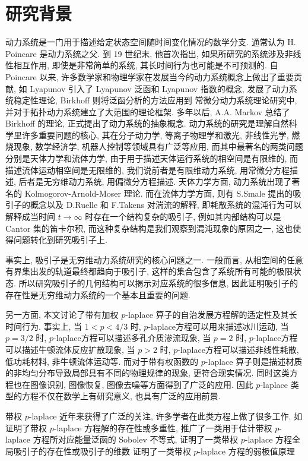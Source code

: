 \documentclass[oneside,longtitle]{LZUthesis}
\numberwithin{equation}{chapter}
\begin{document}
\section{研究背景}
动力系统是一门用于描述给定状态空间随时间变化情况的数学分支.
通常认为 H. Poincare 是动力系统之父.
到 19 世纪末, 他首次指出, 如果所研究的系统涉及非线性相互作用,
即使是非常简单的系统, 其长时间行为也可能是不可预测的.
自 Poincare 以来,
许多数学家和物理学家在发展当今的动力系统概念上做出了重要贡献,
如 Lyapunov 引入了 Lyapunov 泛函和 Lyapunov 指数的概念,
发展了动力系统稳定性理论, Birkhoff 则将泛函分析的方法应用到
常微分动力系统理论研究中, 并对于拓扑动力系统建立了大范围的理论框架.
多年以后, A.A. Markov 总结了 Birkhoff 的理论, 正式提出了动力系统的抽象概念.
动力系统的研究是理解自然科学里许多重要问题的核心,
其在分子动力学, 等离子物理学和激光, 非线性光学, 燃烧现象, 数学经济学, 机器人控制等领域具有广泛等应用,
而其中最著名的两类问题分别是天体力学和流体力学,
由于用于描述天体运行系统的相空间是有限维的, 而描述流体运动相空间是无限维的,
我们说前者是有限维动力系统, 用常微分方程描述, 后者是无穷维动力系统, 用偏微分方程描述.
天体力学方面, 动力系统出现了著名的 Kolmogorov-Arnold-Moser 理论.
而在流体力学方面, 则有 S.Smale 提出的吸引子的概念以及 D.Ruelle 和 F.Takens 对湍流的解释,
即耗散系统的混沌行为可以解释成当时间
$t \to \infty$ 时存在一个结构复杂的吸引子, 例如其内部结构可以是 Cantor 集的笛卡尔积,
而这种复杂结构是我们观察到混沌现象的原因之一, 这也使得问题转化到研究吸引子上.

事实上, 吸引子是无穷维动力系统研究的核心问题之一.
一般而言, 从相空间的任意有界集出发的轨道最终都趋向于吸引子,
这样的集合包含了系统所有可能的极限状态.
所以研究吸引子的几何结构可以揭示对应系统的很多信息,
因此证明吸引子的存在性是无穷维动力系统的一个基本且重要的问题.

另一方面, 本文讨论了带有加权 $p$-laplace 算子的自治发展方程解的适定性及其长时间行为.
事实上, 当 $1 < p < 4/3$ 时, $p$-laplace方程可以用来描述冰川运动,
当 $p = 3/2$ 时, $p$-laplace方程可以描述多孔介质渗流现象,
当 $p = 2$ 时, $p$-laplace方程可以描述牛顿流体反应扩散现象,
当 $p > 2$ 时, $p$-laplace方程可以描述非线性耗散, 低功耗材料, 非牛顿流体运动等.
而对于带有权函数的 $p$-laplace 算子则是描述材质的非均匀分布导致局部具有不同的物理规律的现象,
更符合现实情况. 同时这类方程也在图像识别, 图像恢复, 图像去噪等方面得到了广泛的应用.
因此 $p$-laplace 类型的方程不仅在数学上有研究意义, 也具有广泛的应用前景.

带权 $p$-laplace 近年来获得了广泛的关注, 许多学者在此类方程上做了很多工作.
如\citep{cortazarExistenceSignChanging2014,musinaExistenceMultiplicityResults2009,cavalheiroWeightedSobolevSpaces2008,caldiroliVariationalDegenerateElliptic2000,leBoundaryValueProblems1998,yinEvolutionaryWeightedPLaplacian2007,Zhan2019Uniquenessa}证明了带权 $p$-laplace 方程解的存在性或多重性,
\citep{gazziniSobolevtypeInequalityRelated2009}推广了一类用于估计带权 $p$-laplace 方程所对应能量泛函的 Sobolev 不等式,
\citep{liLongtimeBehaviorClass2014b,maGlobalAttractorsWeighted2012a,galClassDegenerateParabolic2012}证明了一类带权 $p$-laplace 方程全局吸引子的存在性或吸引子的维数
\citep{monticelliMaximumPrinciplesWeak2009}证明了一类带权 $p$-laplace 方程的弱极值原理
\end{document}
